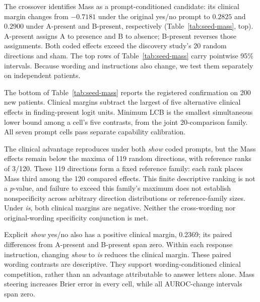 The crossover identifies Mass as a prompt-conditioned candidate: its clinical margin changes from $-0.7181$ under the original yes/no prompt to $0.2825$ and $0.2900$ under A-present and B-present, respectively (Table~\ref{tab:seed-mass}, top). A-present assigns A to presence and B to absence; B-present reverses those assignments. Both coded effects exceed the discovery study's 20 random directions and sham. The top rows of Table~\ref{tab:seed-mass} carry pointwise 95\% intervals. Because wording and instructions also change, we test them separately on independent patients.



The bottom of Table~\ref{tab:seed-mass} reports the registered confirmation on 200 new patients. Clinical margins subtract the largest of five alternative clinical effects in finding-present logit units. Minimum LCB is the smallest simultaneous lower bound among a cell's five contrasts, from the joint 20-comparison family. All seven prompt cells pass separate capability calibration.

The clinical advantage reproduces under both \textit{show} coded prompts, but the Mass effects remain below the maxima of 119 random directions, with reference ranks of 3/120. These 119 directions form a fixed reference family: each rank places Mass third among the 120 compared effects. This finite descriptive ranking is not a $p$-value, and failure to exceed this family's maximum does not establish nonspecificity across arbitrary direction distributions or reference-family sizes. Under \textit{is}, both clinical margins are negative. Neither the cross-wording nor original-wording specificity conjunction is met.

Explicit \textit{show} yes/no also has a positive clinical margin, 0.2369; its paired differences from A-present and B-present span zero. Within each response instruction, changing \textit{show} to \textit{is} reduces the clinical margin. These paired wording contrasts are descriptive. They support wording-conditioned clinical competition, rather than an advantage attributable to answer letters alone. Mass steering increases Brier error in every cell, while all AUROC-change intervals span zero.

\FloatBarrier
